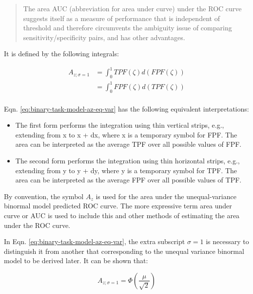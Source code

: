\documentclass[
]{book}
\begin{document}
\begin{quote}
The area AUC (abbreviation for area under curve) under the ROC curve suggests itself as a measure of performance that is independent of threshold and therefore circumvents the ambiguity issue of comparing sensitivity/specificity pairs, and has other advantages.
\end{quote}

It is defined by the following integrals:

\begin{equation} 
\begin{aligned}
A_{z;\sigma = 1} &= \int_{0}^{1}TPF(\zeta)d(FPF(\zeta))\\
&=\int_{0}^{1}FPF(\zeta)d(TPF(\zeta))\\
\end{aligned}
\label{eq:binary-task-model-az-eq-var}
\end{equation}

Eqn. \eqref{eq:binary-task-model-az-eq-var} has the following equivalent interpretations:

\begin{itemize}
\item
  The first form performs the integration using thin vertical strips, e.g., extending from x to x + dx, where x is a temporary symbol for FPF. The area can be interpreted as the average TPF over all possible values of FPF.
\item
  The second form performs the integration using thin horizontal strips, e.g., extending from y to y + dy, where y is a temporary symbol for TPF. The area can be interpreted as the average FPF over all possible values of TPF.
\end{itemize}

By convention, the symbol \(A_z\) is used for the area under the unequal-variance binormal model predicted ROC curve. The more expressive term area under curve or AUC is used to include this and other methods of estimating the area under the ROC curve.

In Eqn. \eqref{eq:binary-task-model-az-eq-var}, the extra subscript \(\sigma = 1\) is necessary to distinguish it from another that corresponding to the unequal variance binormal model to be derived later. It can be shown that:

\begin{equation} 
A_{z;\sigma = 1} = \Phi\left ( \frac{\mu} {\sqrt{2}} \right )
\label{eq:binary-task-model-az-var}
\end{equation}
\end{document}
